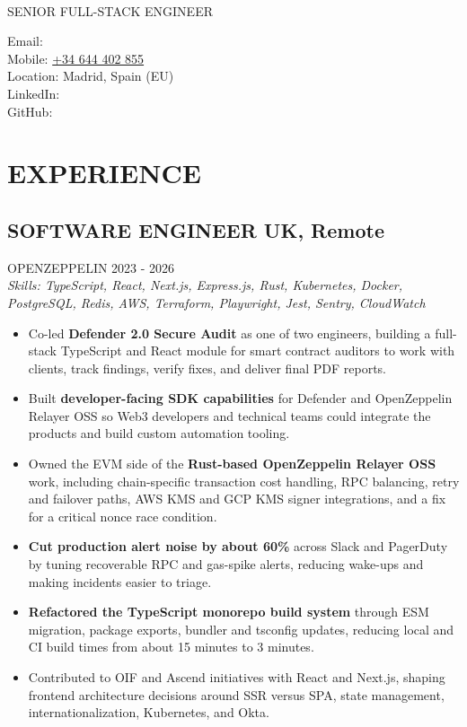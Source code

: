 \documentclass{article}
\newcommand{\WorkExperience}[2]{
   \subsection*{#1}
   \vspace{-1em}
   \uppercase{#2}
}
\newcommand{\Skills}[1]{
   \textit{Skills: #1}
}
\begin{document}
\begin{center}
	\begin{minipage}{0.5\textwidth}
		{\fontsize{24}{28}\Title{}} \\
		\bigskip
		{\normalsize \MakeUppercase{Senior Full-Stack Engineer}}
	\end{minipage} \hfill
	\begin{minipage}{0.4\textwidth}
		\raggedleft{}
		Email: \href{mailto:\ResumeEmail}{\ResumeEmail} \\
		Mobile: \href{tel:+34644402855}{+34 644 402 855}  \\
		Location: Madrid, Spain (EU) \\
		LinkedIn: \href{\ResumeLinkedInUrl}{\ResumeLinkedInLabel} \\
		GitHub: \href{\ResumeGitHubUrl}{\ResumeGitHubLabel}
	\end{minipage}
\end{center}

\vspace{-3em}

\phantom{Amazon, Microsoft, Facebook} %

\section*{EXPERIENCE}
\WorkExperience{SOFTWARE ENGINEER \hfill UK, Remote}{OpenZeppelin \hfill 2023 {-} 2026} \\
\Skills{TypeScript, React, Next.js, Express.js, Rust, Kubernetes, Docker, PostgreSQL, Redis, AWS, Terraform, Playwright, Jest, Sentry, CloudWatch}
\begin{itemize}
\item Co-led \textbf{Defender 2.0 Secure Audit} as one of two engineers, building a full-stack TypeScript and React module for smart contract auditors to work with clients, track findings, verify fixes, and deliver final PDF reports.
\item Built \textbf{developer-facing SDK capabilities} for Defender and OpenZeppelin Relayer OSS so Web3 developers and technical teams could integrate the products and build custom automation tooling.
\item Owned the EVM side of the \textbf{Rust-based OpenZeppelin Relayer OSS} work, including chain-specific transaction cost handling, RPC balancing, retry and failover paths, AWS KMS and GCP KMS signer integrations, and a fix for a critical nonce race condition.
\item \textbf{Cut production alert noise by about 60\%} across Slack and PagerDuty by tuning recoverable RPC and gas-spike alerts, reducing wake-ups and making incidents easier to triage.
\item \textbf{Refactored the TypeScript monorepo build system} through ESM migration, package exports, bundler and tsconfig updates, reducing local and CI build times from about 15 minutes to 3 minutes.
\item Contributed to OIF and Ascend initiatives with React and Next.js, shaping frontend architecture decisions around SSR versus SPA, state management, internationalization, Kubernetes, and Okta.
\end{itemize}
\end{document}

